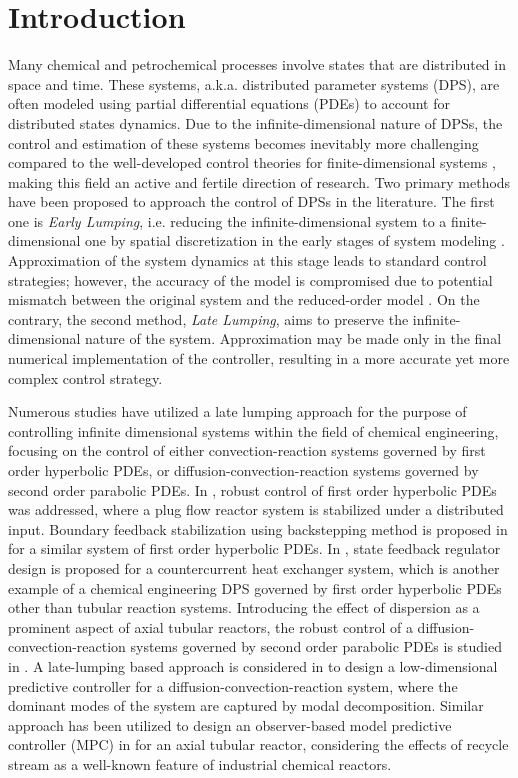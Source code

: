 \section{Introduction}

Many chemical and petrochemical processes involve states that are distributed in space and time. These systems, a.k.a. distributed parameter systems (DPS), are often modeled using partial differential equations (PDEs) to account for distributed states dynamics. Due to the infinite-dimensional nature of DPSs, the control and estimation of these systems becomes inevitably more challenging compared to the well-developed control theories for finite-dimensional systems \cite{ray1981advanced}, making this field an active and fertile direction of research. Two primary methods have been proposed to approach the control of DPSs in the literature. The first one is \textit{Early Lumping}, i.e. reducing the infinite-dimensional system to a finite-dimensional one by spatial discretization in the early stages of system modeling \cite{davison1976robust}. Approximation of the system dynamics at this stage leads to standard control strategies; however, the accuracy of the model is compromised due to potential mismatch between the original system and the reduced-order model \cite{moghadam2012infinite}. On the contrary, the second method, \textit{Late Lumping}, aims to preserve the infinite-dimensional nature of the system. Approximation may be made only in the final numerical implementation of the controller, resulting in a more accurate yet more complex control strategy.

Numerous studies have utilized a late lumping approach for the purpose of controlling infinite dimensional systems within the field of chemical engineering, focusing on the control of either convection-reaction systems governed by first order hyperbolic PDEs, or diffusion-convection-reaction systems governed by second order parabolic PDEs. 
In \cite{christofides1996feedback}, robust control of first order hyperbolic PDEs was addressed, where a plug flow reactor system is stabilized under a distributed input. 
Boundary feedback stabilization using backstepping method is proposed in \cite{krstic2008backstepping} for a similar system of first order hyperbolic PDEs. 
In \cite{xu2016state}, state feedback regulator design is proposed for a countercurrent heat exchanger system, which is another example of a chemical engineering DPS governed by first order hyperbolic PDEs other than tubular reaction systems.
Introducing the effect of dispersion as a prominent aspect of axial tubular reactors, the robust control of a diffusion-convection-reaction systems governed by second order parabolic PDEs is studied in \cite{christofides1998robust}. 
A late-lumping based approach is considered in \cite{dubljevic2006predictive2} to design a low-dimensional predictive controller for a diffusion-convection-reaction system, where the dominant modes of the system are captured by modal decomposition. 
Similar approach has been utilized to design an observer-based model predictive controller (MPC) in \cite{khatibi2021model} for an axial tubular reactor, considering the effects of recycle stream as a well-known feature of industrial chemical reactors.

